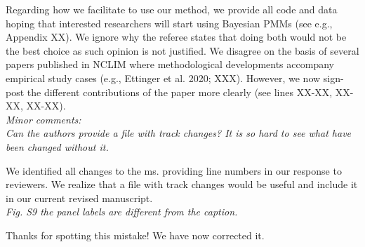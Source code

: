 \documentclass[11pt]{article}
\begin{document}
Regarding how we facilitate to use our method, we provide all code and data hoping that interested researchers will start using Bayesian PMMs (see e.g., Appendix XX). We ignore why the referee states that doing both would not be the best choice as such opinion is not justified. We disagree on the basis of several papers published in NCLIM where methodological developments accompany empirical study cases (e.g., Ettinger et al. 2020; XXX). However, we now sign-post the different contributions of the paper more clearly (see lines XX-XX, XX-XX, XX-XX).\\


\emph{Minor comments:}\\
\emph{Can the authors provide a file with track changes? It is so hard to see what have been changed without it.}

We identified all changes to the ms. providing line numbers in our response to reviewers. We realize that a file with track changes would be useful and include it in our current revised manuscript.\\


\emph{Fig. S9 the panel labels are different from the caption.}


Thanks for spotting this mistake! We have now corrected it.\\




\end{document}
